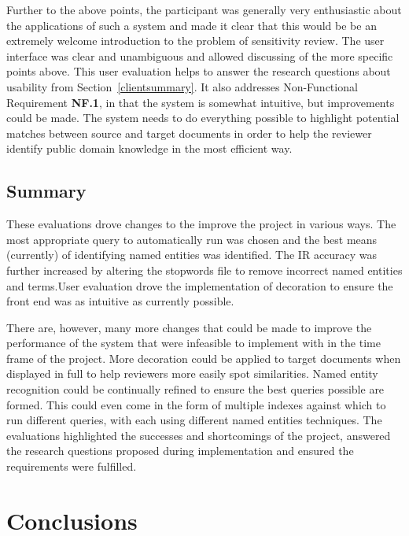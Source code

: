\documentclass{l4proj}
\begin{document}
Further to the above points, the participant was generally very enthusiastic about the applications of such a system and made it clear that this would be be an extremely welcome introduction to the problem of sensitivity review. The user interface was clear and unambiguous and allowed discussing of the more specific points above.
This user evaluation helps to answer the research questions about usability from Section~\ref{clientsummary}. It also addresses Non-Functional Requirement \textbf{NF.1}, in that the system is somewhat intuitive, but improvements could be made.
The system needs to do everything possible to highlight potential matches between source and target documents in order to help the reviewer identify public domain knowledge in the most efficient way.

\section{Summary}
These evaluations drove changes to the improve the project in various ways. The most appropriate query to automatically run was chosen and the best means (currently) of identifying named entities was identified. The IR accuracy was further increased by altering the stopwords file to remove incorrect named entities and terms.User evaluation drove the implementation of decoration to ensure the front end was as intuitive as currently possible.

There are, however, many more changes that could be made to improve the performance of the system that were infeasible to implement with in the time frame of the project.
More decoration could be applied to target documents when displayed in full to help reviewers more easily spot similarities.
Named entity recognition could be continually refined to ensure the best queries possible are formed. This could even come in the form of multiple indexes against which to run different queries, with each using different named entities techniques.
The evaluations highlighted the successes and shortcomings of the project, answered the research questions proposed during implementation and ensured the requirements were fulfilled.

\chapter{Conclusions} \label{conclusion}
\end{document}
